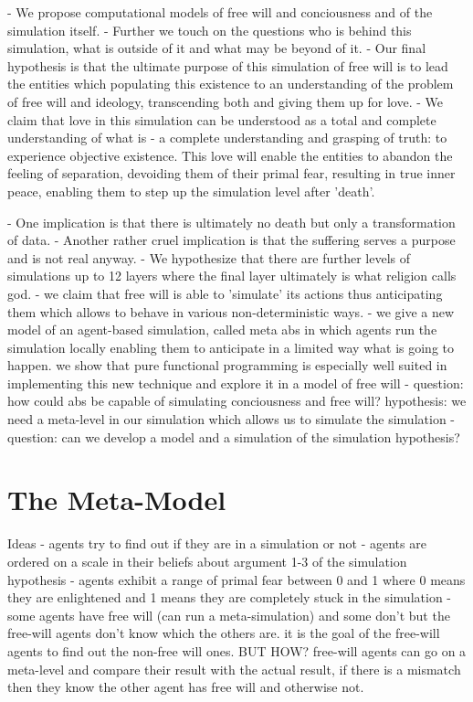 \documentclass{article}
\begin{document}
- We propose computational models of free will and conciousness and of the simulation itself.
- Further we touch on the questions who is behind this simulation, what is outside of it and what may be beyond of it.
- Our final hypothesis is that the ultimate purpose of this simulation of free will is to lead the entities which populating this existence to an understanding of the problem of free will and ideology, transcending both and giving them up for love.
- We claim that love in this simulation can be understood as a total and complete understanding of what is - a complete understanding and grasping of truth: to experience objective existence. This love will enable the entities to abandon the feeling of separation, devoiding them of their primal fear, resulting in true inner peace, enabling them to step up the simulation level after 'death'.

- One implication is that there is ultimately no death but only a transformation of data.
- Another rather cruel implication is that the suffering serves a purpose and is not real anyway.
- We hypothesize that there are further levels of simulations up to 12 layers where the final layer ultimately is what religion calls god.
- we claim that free will is able to 'simulate' its actions thus anticipating them which allows to behave in various non-deterministic ways.
- we give a new model of an agent-based simulation, called meta abs in which agents run the simulation locally enabling them to anticipate in a limited way what is going to happen. we show that pure functional programming is especially well suited in implementing this new technique and explore it in a model of free will
- question: how could abs be capable of simulating conciousness and free will? hypothesis: we need a meta-level in our simulation which allows us to simulate the simulation
- question: can we develop a model and a simulation of the simulation hypothesis?

\section{The Meta-Model}
Ideas
- agents try to find out if they are in a simulation or not
- agents are ordered on a scale in their beliefs about argument 1-3 of the simulation hypothesis 
- agents exhibit a range of primal fear between 0 and 1 where 0 means they are enlightened and 1 means they are completely stuck in the simulation
- some agents have free will (can run a meta-simulation) and some don't but the free-will agents don't know which the others are. it is the goal of the free-will agents to find out the non-free will ones. BUT HOW? free-will agents can go on a meta-level and compare their result with the actual result, if there is a mismatch then they know the other agent has free will and otherwise not.



\end{document}
